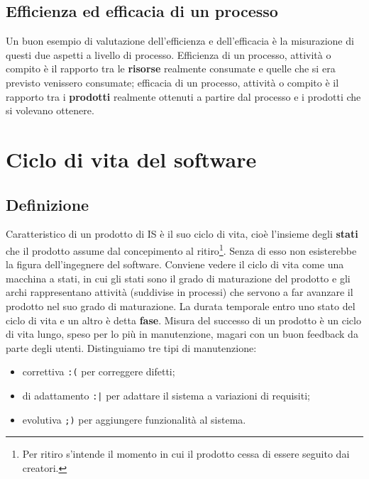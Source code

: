 \documentclass[a4paper]{article}
\begin{document}
		
	\subsection{Efficienza ed efficacia di un processo}

		
Un buon esempio di valutazione dell'efficienza e dell'efficacia è la misurazione di questi due aspetti a livello di processo. Efficienza di un processo, attività o compito è il rapporto tra le \textbf{risorse} realmente consumate e quelle che si era previsto venissero consumate; efficacia di un processo, attività o compito è il rapporto tra i \textbf{prodotti} realmente ottenuti a partire dal processo e i prodotti che si volevano ottenere.
	


		
	\section{Ciclo di vita del software}


		
	\subsection{Definizione}

		
Caratteristico di un prodotto di IS è il suo ciclo di vita, cioè l'insieme degli \textbf{stati} che il prodotto assume dal concepimento al ritiro\footnote{Per ritiro s'intende il momento in cui il prodotto cessa di essere seguito dai creatori.}. Senza di esso non esisterebbe la figura dell'ingegnere del software. Conviene vedere il ciclo di vita come una macchina a stati, in cui gli stati sono il grado di maturazione del prodotto e gli archi rappresentano attività (suddivise in processi) che servono a far avanzare il prodotto nel suo grado di maturazione. La durata temporale entro uno stato del ciclo di vita e un altro è detta \textbf{fase}. Misura del successo di un prodotto è un ciclo di vita lungo, speso per lo più in manutenzione, magari con un buon feedback da parte degli utenti. Distinguiamo tre tipi di manutenzione:
		
	\begin{itemize}
		
			
	\item correttiva  \texttt{:(}  per correggere difetti;
			
	\item di adattamento  \texttt{:|}  per adattare il sistema a variazioni di requisiti;
			
	\item evolutiva  \texttt{;)}  per aggiungere funzionalità al sistema.
		
	\end{itemize}
\end{document}

